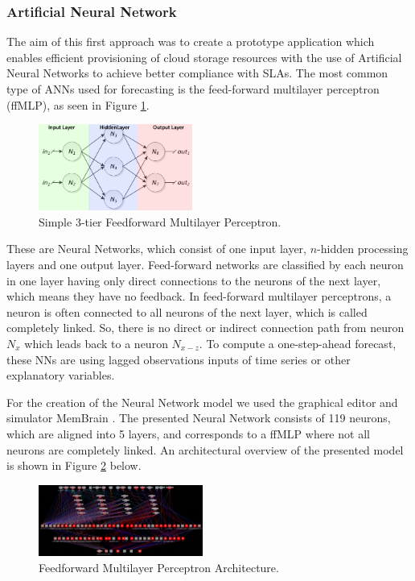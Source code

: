 \subsubsection{Artificial Neural Network}
The aim of this first approach  was to create a prototype application which enables efficient provisioning of cloud storage resources with the use of Artificial Neural Networks to achieve better compliance with SLAs. The most common type of ANNs used for forecasting is the feed-forward multilayer perceptron (ffMLP), as seen in Figure \ref{fig:Netz}. 

\begin{figure}[ht]
	\begin{center}
		\includegraphics[width=0.45\textwidth]{fig/netz.png}
	\end{center}
	\caption{Simple 3-tier Feedforward Multilayer Perceptron.}
	\label{fig:Netz}
\end{figure}

These are Neural Networks, which consist of one input layer, $n$-hidden processing layers and one output layer. Feed-forward networks are classified by each neuron in one layer having only direct connections to the neurons of the next layer, which means they have no feedback. In feed-forward multilayer perceptrons, a neuron is often connected to all neurons of the next layer, which is called completely linked. So, there is no direct or indirect connection path from neuron $ N_{x} $ which leads back to a neuron $ N_{x-z} $. To compute a one-step-ahead forecast, these NNs are using lagged observations inputs of time series or other explanatory variables. 

For the creation of the Neural Network model we used the graphical editor and simulator MemBrain \cite{MemBrain}. The presented Neural Network consists of 119 neurons, which are aligned into 5 layers, and corresponds to a ffMLP where not all neurons are completely linked. An architectural overview of the presented model is shown in Figure \ref{fig:Netz2} below.


\begin{figure}[ht]
	\begin{center}
		\includegraphics[width=0.48\textwidth]{fig/netz2.png}
	\end{center}
	\caption{Feedforward Multilayer Perceptron Architecture.}
	\label{fig:Netz2}
\end{figure}

